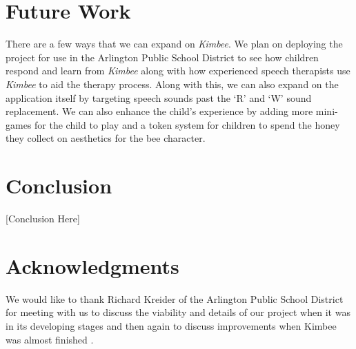 \documentclass{sig-alternate-2013}
\begin{document}
\section{Future Work}
\label{sec:future_work}

There are a few ways that we can expand on {\em Kimbee}. We plan on deploying the project for use in the Arlington Public School District to see how children respond and learn from {\em Kimbee} along with how experienced speech therapists use {\em Kimbee} to aid the therapy process. Along with this, we can also expand on the application itself by targeting speech sounds past the `R' and `W' sound replacement. We can also enhance the child's experience by adding more mini-games for the child to play and a token system for children to spend the honey they collect on aesthetics for the bee character.

\section{Conclusion}

[Conclusion Here]

\section{Acknowledgments}

We would like to thank Richard Kreider of the Arlington Public School District for meeting with us to discuss the viability and details of our project when it was in its developing stages and then again to discuss improvements when Kimbee was almost finished \cite{Kreider:Intro,Kreider:Results}.




\balancecolumns
\end{document}
